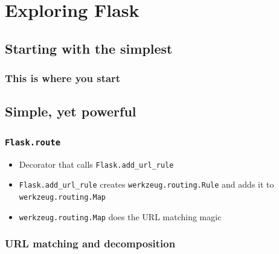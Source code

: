 \documentclass{beamer}
\begin{document}
\section{Exploring Flask}

\subsection{Starting with the simplest}

\begin{frame}[fragile]
  \frametitle{This is where you start}
\end{frame}

\subsection{Simple, yet powerful}

\begin{frame}
  \frametitle{\texttt{Flask.route}}
  \begin{itemize}
  \item Decorator that calls \texttt{Flask.add\_url\_rule}
  \item \texttt{Flask.add\_url\_rule} creates \texttt{werkzeug.routing.Rule}
    and adds it to \texttt{werkzeug.routing.Map}
  \item \texttt{werkzeug.routing.Map} does the URL matching magic
  \end{itemize}
\end{frame}

\begin{frame}
  \frametitle{URL matching and decomposition}
\end{frame}
\end{document}
